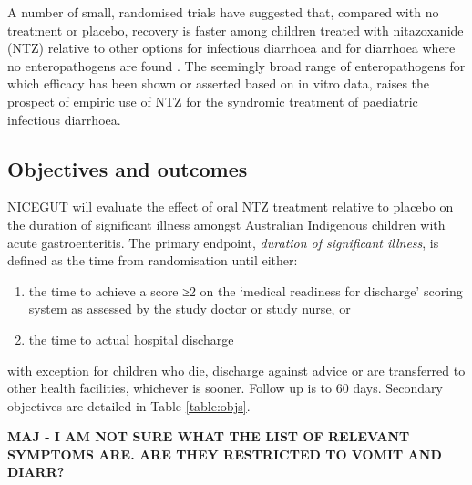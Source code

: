 \documentclass[a4paper]{article}
\begin{document}
A number of small, randomised trials have suggested that, compared with no treatment or placebo, recovery is faster among children treated with nitazoxanide (NTZ) relative to other options for infectious diarrhoea and for diarrhoea where no enteropathogens are found \cite{Waddingtone019632}.
The seemingly broad range of enteropathogens for which efficacy has been shown or asserted based on in vitro data, raises the prospect of empiric use of NTZ for the syndromic treatment of paediatric infectious diarrhoea.

\subsection{Objectives and outcomes}

NICEGUT will evaluate the effect of oral NTZ treatment relative to placebo on the duration of significant illness amongst Australian Indigenous children with acute gastroenteritis.
The primary endpoint, \textit{duration of significant illness}, is defined as the time from randomisation until either:
\begin{enumerate}
    \item the time to achieve a score ≥2 on the `medical readiness for discharge' scoring system \cite{Waddingtone019632} as assessed by the study doctor or study nurse, or
    \item the time to actual hospital discharge
\end{enumerate}
with exception for children who die, discharge against advice or are transferred to other health facilities, whichever is sooner.
Follow up is to 60 days.
Secondary objectives are detailed in Table \ref{table:objs}.

\textbf{MAJ - I AM NOT SURE WHAT THE LIST OF RELEVANT SYMPTOMS ARE. ARE THEY RESTRICTED TO VOMIT AND DIARR?}
\end{document}
